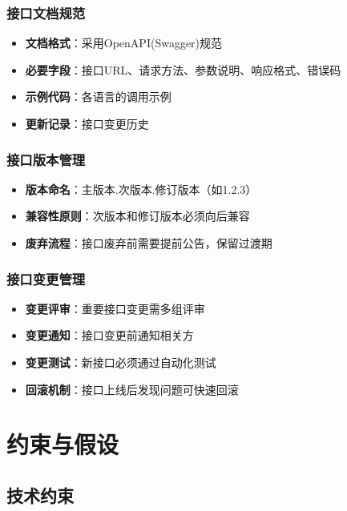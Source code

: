 \documentclass[a4paper,12pt]{article}
\begin{document}
\subsubsection{接口文档规范}

\begin{itemize}
  \item \textbf{文档格式}：采用OpenAPI(Swagger)规范
  \item \textbf{必要字段}：接口URL、请求方法、参数说明、响应格式、错误码
  \item \textbf{示例代码}：各语言的调用示例
  \item \textbf{更新记录}：接口变更历史
\end{itemize}

\subsubsection{接口版本管理}

\begin{itemize}
  \item \textbf{版本命名}：主版本.次版本.修订版本（如1.2.3）
  \item \textbf{兼容性原则}：次版本和修订版本必须向后兼容
  \item \textbf{废弃流程}：接口废弃前需要提前公告，保留过渡期
\end{itemize}

\subsubsection{接口变更管理}

\begin{itemize}
  \item \textbf{变更评审}：重要接口变更需多组评审
  \item \textbf{变更通知}：接口变更前通知相关方
  \item \textbf{变更测试}：新接口必须通过自动化测试
  \item \textbf{回滚机制}：接口上线后发现问题可快速回滚
\end{itemize}

\section{约束与假设}

\subsection{技术约束}
\end{document}
